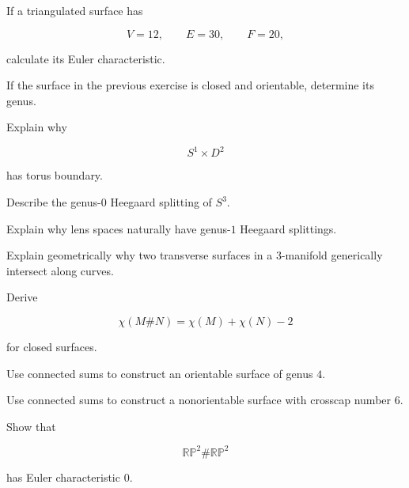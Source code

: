 \begin{exercise}[2]
If a triangulated surface has

\[
V=12,\qquad E=30,\qquad F=20,
\]

calculate its Euler characteristic.
\end{exercise}

\begin{exercise}[2]
If the surface in the previous exercise is closed and orientable, determine
its genus.
\end{exercise}

\begin{exercise}[2]
Explain why

\[
S^1\times D^2
\]

has torus boundary.
\end{exercise}

\begin{exercise}[2]
Describe the genus-\(0\) Heegaard splitting of \(S^3\).
\end{exercise}

\begin{exercise}[2]
Explain why lens spaces naturally have genus-\(1\) Heegaard splittings.
\end{exercise}

\begin{exercise}[2]
Explain geometrically why two transverse surfaces in a \(3\)-manifold
generically intersect along curves.
\end{exercise}

\begin{exercise}[3]
Derive

\[
\chi(M\#N)=\chi(M)+\chi(N)-2
\]

for closed surfaces.
\end{exercise}

\begin{exercise}[3]
Use connected sums to construct an orientable surface of genus \(4\).
\end{exercise}

\begin{exercise}[3]
Use connected sums to construct a nonorientable surface with crosscap number
\(6\).
\end{exercise}

\begin{exercise}[3]
Show that

\[
\mathbb{RP}^2\#\mathbb{RP}^2
\]

has Euler characteristic \(0\).
\end{exercise}

